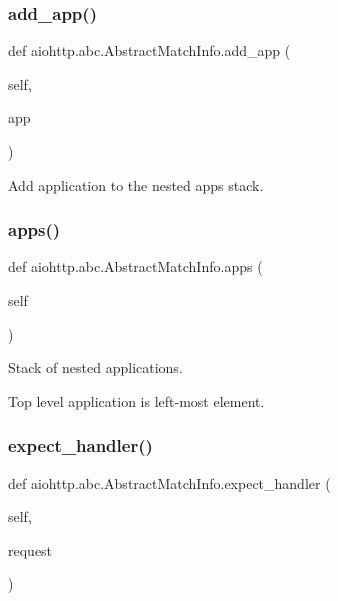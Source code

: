 \subsubsection{\texorpdfstring{add\+\_\+app()}{add\_app()}}
{\footnotesize\ttfamily def aiohttp.\+abc.\+Abstract\+Match\+Info.\+add\+\_\+app (\begin{DoxyParamCaption}\item[{}]{self,  }\item[{}]{app }\end{DoxyParamCaption})}

\begin{DoxyVerb}Add application to the nested apps stack.\end{DoxyVerb}
 \mbox{\label{classaiohttp_1_1abc_1_1_abstract_match_info_aaef04591d8ebaf5eb23cdd3e81e96eae}} 
\subsubsection{\texorpdfstring{apps()}{apps()}}
{\footnotesize\ttfamily def aiohttp.\+abc.\+Abstract\+Match\+Info.\+apps (\begin{DoxyParamCaption}\item[{}]{self }\end{DoxyParamCaption})}

\begin{DoxyVerb}Stack of nested applications.

Top level application is left-most element.\end{DoxyVerb}
 \mbox{\label{classaiohttp_1_1abc_1_1_abstract_match_info_a3361b132ccb23e2c6c4016e368da4a3d}} 
\subsubsection{\texorpdfstring{expect\+\_\+handler()}{expect\_handler()}}
{\footnotesize\ttfamily def aiohttp.\+abc.\+Abstract\+Match\+Info.\+expect\+\_\+handler (\begin{DoxyParamCaption}\item[{}]{self,  }\item[{}]{request }\end{DoxyParamCaption})}

